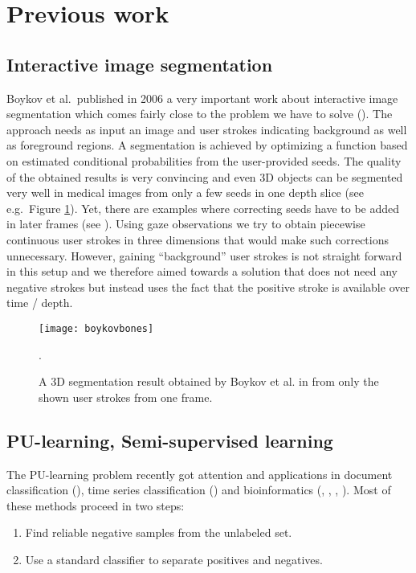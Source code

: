 \section{Previous work}
\subsection{Interactive image segmentation}
Boykov et al.\ published in 2006 a very important work about interactive image segmentation which comes fairly close to the problem we have to solve (\cite{boykov2006graph}). 
The approach needs as input an image and user strokes indicating background as well as foreground regions. 
A segmentation is achieved by optimizing a function based on estimated conditional probabilities from the user-provided seeds. 
The quality of the obtained results is very convincing and even 3D objects can be segmented very well in medical images from only a few seeds in one depth slice (see e.g.\ Figure \ref{fig:boykovbones}). 
Yet, there are examples where correcting seeds have to be added in later frames (see \cite[Section~Experimental Results]{boykov2006graph}). 
Using gaze observations we try to obtain piecewise continuous user strokes in three dimensions that would make such corrections unnecessary. However, gaining ``background'' user strokes is not straight forward in this setup and we therefore aimed towards a solution that does not need any negative strokes but instead uses the fact that the positive stroke is available over time / depth.

\begin{figure}[ht]
	\centering
	\texttt{[image: boykovbones]}
	\caption{A 3D segmentation result obtained by Boykov et al. in \cite{boykov2006graph} from only the shown user strokes from one frame.}.
	\label{fig:boykovbones}
\end{figure}

\subsection{PU-learning, Semi-supervised learning}
The PU-learning problem recently got attention and applications in document classification (\cite{li2003learning}), time series classification (\cite{nguyen2011positive}) and bioinformatics (\cite{elkan2008learning}, \cite{yang2012positive}, \cite{yang2014ensemble}, \cite{yousef2015novel}). 
Most of these methods proceed in two steps: 
\begin{enumerate}
 \item Find reliable negative samples from the unlabeled set.
 \item Use a standard classifier to separate positives and negatives.
\end{enumerate}

